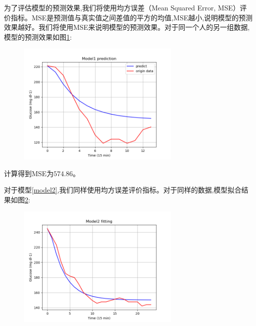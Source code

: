     为了评估模型的预测效果,我们将使用均方误差（Mean Squared Error, MSE）评价指标。MSE是预测值与真实值之间差值的平方的均值,MSE越小,说明模型的预测效果越好。我们将使用MSE来说明模型的预测效果。对于同一个人的另一组数据,模型的预测效果如图\ref{fig:predict_1}:
    \begin{figure}[H]
        \centering
        \includegraphics[width=0.7\textwidth]{Img/predict_1.png}
        \label{fig:predict_1}
    \end{figure}

    计算得到MSE为$574.86$。

    对于模型\ref{model2},我们同样使用均方误差评价指标。对于同样的数据,模型拟合结果如图\ref{fig:fit}:
    \begin{figure}[H]
        \centering
        \includegraphics[width=0.7\textwidth]{Img/fit.png}
        \label{fig:fit}
    \end{figure}

